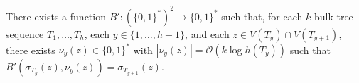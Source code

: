 \documentclass[10pt, conference, compsocconf]{IEEEtran}
\newcommand{\snote}[1]{\fcolorbox{red}{yellow}{#1}}
\newcommand{\Oh}{\mathcal{O}}
\let\geq\geqslant
\begin{document}

\begin{lem}
  There exists a function $B':(\{0,1\}^*)^2\to\{0,1\}^*$ such that, for each $k$-bulk tree sequence $T_1,\dots,T_h$, each $y\in\{1,\dots,h-1\}$, and each $z\in V(T_y)\cap V(T_{y+1})$, there exists $\nu_y(z)\in\{0,1\}^*$ with $|\nu_y(z)| = \Oh(k\log h(T_y))$ such that $B'(\sigma_{T_y}(z), \nu_y(z)) = \sigma_{T_{y+1}}(z)$.
\end{lem}



\end{document}
